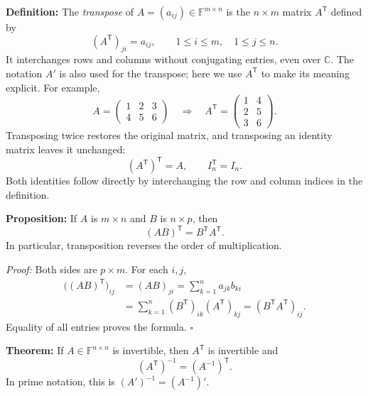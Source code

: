 \documentclass[a4paper,11pt,abstract=true]{scrartcl}
\theoremstyle{dotlessP}
\theoremstyle{dotlessS}
\theoremstyle{remark}
\theoremstyle{definition}
\begin{document}
\begin{definition_box}
\textbf{Definition:} The
\emph{transpose} of $A=(a_{ij})\in\mathbb{F}^{m\times n}$ is the
$n\times m$ matrix $A^{\mathsf{T}}$ defined by
\[
{(A^{\mathsf{T}})}_{ji}=a_{ij},
\qquad 1\leq i\leq m,\quad 1\leq j\leq n.
\]
It interchanges rows and columns without conjugating entries, even
over $\mathbb{C}$. The notation $A'$ is also used for the transpose;
here we use $A^{\mathsf{T}}$ to make its meaning explicit. For example,
\[
A=\begin{pmatrix}1&2&3\\4&5&6\end{pmatrix}
\quad\Longrightarrow\quad
A^{\mathsf{T}}=\begin{pmatrix}1&4\\2&5\\3&6\end{pmatrix}.
\]
Transposing twice restores the original matrix, and transposing an
identity matrix leaves it unchanged:
\[
{(A^{\mathsf{T}})}^{\mathsf{T}}=A,\qquad I_n^{\mathsf{T}}=I_n.
\]
Both identities follow directly by interchanging the row and column
indices in the definition.
\end{definition_box}

\begin{problem_box}
\textbf{Proposition:} If $A$ is
$m\times n$ and $B$ is $n\times p$, then
\[
{(AB)}^{\mathsf{T}}=B^{\mathsf{T}}A^{\mathsf{T}}.
\]
In particular, transposition reverses the order of multiplication.

\end{problem_box}

\begin{claim_box}
\textit{Proof:} Both sides are $p\times m$. For each $i,j$,
\[
\begin{aligned}
{\bigl({(AB)}^{\mathsf{T}}\bigr)}_{ij}
&={(AB)}_{ji}=\sum_{k=1}^n a_{jk}b_{ki}\\
&=\sum_{k=1}^n {(B^{\mathsf{T}})}_{ik}{(A^{\mathsf{T}})}_{kj}
={(B^{\mathsf{T}}A^{\mathsf{T}})}_{ij}.
\end{aligned}
\]
Equality of all entries proves the formula. \hfill$\square$
\end{claim_box}

\begin{problem_box}
\textbf{Theorem:} If
$A\in\mathbb{F}^{n\times n}$ is invertible, then $A^{\mathsf{T}}$
is invertible and
\[
\boxed{{(A^{\mathsf{T}})}^{-1}={(A^{-1})}^{\mathsf{T}}.}
\]
In prime notation, this is ${(A')}^{-1}={(A^{-1})}'$.

\end{problem_box}
\end{document}
